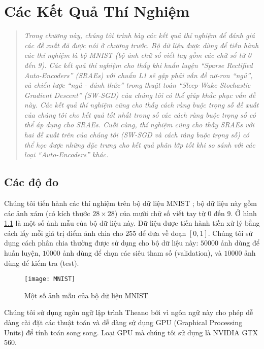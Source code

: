 \chapter{Các Kết Quả Thí Nghiệm}
\ifpdf
    \graphicspath{{Chapter4/Chapter4Figs/PNG/}{Chapter4/Chapter4Figs/PDF/}{Chapter4/Chapter4Figs/}}
\else
    \graphicspath{{Chapter4/Chapter4Figs/EPS/}{Chapter4/Chapter4Figs/}}
\fi
\label{chap_4}
\begin{quote}
\textit{Trong chương này, chúng tôi trình bày các kết quả thí nghiệm để đánh giá các đề xuất đã được nói ở chương trước. Bộ dữ liệu được dùng để tiến hành các thí nghiệm là bộ MNIST (bộ ảnh chữ số viết tay gồm các chữ số từ 0 đến 9). Các kết quả thí nghiệm cho thấy khi huấn luyện ``Sparse Rectified Auto-Encoders'' (SRAEs) với chuẩn L1 sẽ gặp phải vấn đề nơ-ron ``ngủ'', và chiến lược ``ngủ - đánh thức'' trong thuật toán ``Sleep-Wake Stochastic Gradient Descent'' (SW-SGD) của chúng tôi có thể giúp khắc phục vấn đề này. Các kết quả thí nghiệm cũng cho thấy cách ràng buộc trọng số đề xuất của chúng tôi cho kết quả tốt nhất trong số các cách ràng buộc trọng số có thể áp dụng cho SRAEs. Cuối cùng, thí nghiệm cũng cho thấy SRAEs với hai đề xuất trên của chúng tôi (SW-SGD và cách ràng buộc trọng số) có thể học được những đặc trưng cho kết quả phân lớp tốt khi so sánh với các loại ``Auto-Encoders'' khác.}
\end{quote}
\section{Các độ đo}
Chúng tôi tiến hành các thí nghiệm trên bộ dữ liệu MNIST \cite{MNIST}; bộ dữ liệu này gồm các ảnh xám (có kích thước $28 \times 28$) của mười chữ số viết tay từ 0 đến 9. Ở hình \ref{fig_MNIST} là một số ảnh mẫu của bộ dữ liệu này. Dữ liệu được tiến hành tiền xử lý bằng cách lấy mỗi giá trị điểm ảnh chia cho $255$ để đưa về đoạn $[0, 1]$. Chúng tôi sử dụng cách phân chia thường được sử dụng cho bộ dữ liệu này: $50000$ ảnh dùng để huấn luyện, $10000$ ảnh dùng để chọn các siêu tham số (validation), và $10000$ ảnh dùng để kiểm tra (test).

\begin{figure}
	\centering
	\texttt{[image: MNIST]}
	\caption{Một số ảnh mẫu của bộ dữ liệu MNIST}
	\label{fig_MNIST}
\end{figure}

Chúng tôi sử dụng ngôn ngữ lập trình Theano \cite{bergstra+al:2010-scipy} bởi vì ngôn ngữ này cho phép dễ dàng cài đặt các thuật toán và dễ dàng sử dụng GPU (Graphical Processing Units) để tính toán song song. Loại GPU mà chúng tôi sử dụng là NVIDIA GTX 560.

